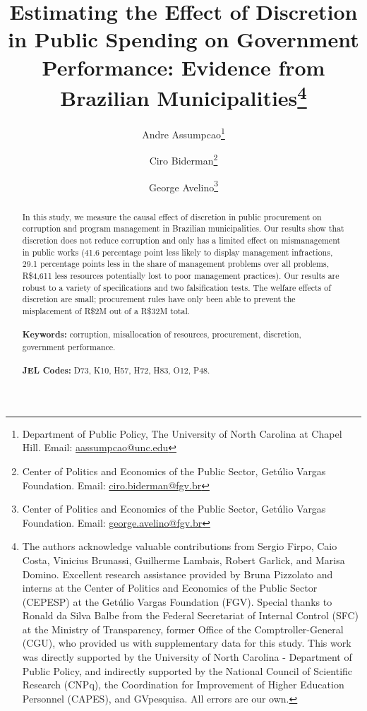 \documentclass[11pt]{article}
\begin{document}
\begin{titlepage}
\title{Estimating the Effect of Discretion in Public Spending on Government Performance: Evidence from Brazilian Municipalities\thanks{The authors acknowledge valuable contributions from Sergio Firpo, Caio Costa, Vinicius Brunassi, Guilherme Lambais,
Robert Garlick, and Marisa Domino. Excellent research assistance provided by Bruna Pizzolato and interns at the Center of Politics and Economics of the Public Sector (CEPESP) at the Getúlio Vargas Foundation (FGV). Special thanks to Ronald da Silva Balbe from the Federal Secretariat of Internal Control (SFC) at the Ministry of Transparency, former Office of the Comptroller-General (CGU), who provided us with supplementary data for this study. This work was directly supported by the University of North Carolina - Department of Public Policy, and indirectly supported by the National Council of Scientific Research (CNPq), the Coordination for Improvement of Higher Education Personnel (CAPES), and GVpesquisa. All errors are our own.}}
\author{Andre Assumpcao\thanks{Department of Public Policy, The University of North Carolina at Chapel Hill. Email: \href{mailto:aassumpcao@unc.edu}{aassumpcao@unc.edu}} \and Ciro Biderman\thanks{Center of Politics and Economics of the Public Sector, Getúlio Vargas Foundation. Email: \href{mailto:ciro.biderman@fgv.br}{ciro.biderman@fgv.br}} \and George Avelino\thanks{Center of Politics and Economics of the Public Sector, Getúlio Vargas Foundation. Email: \href{mailto:george.avelino@fgv.br}{george.avelino@fgv.br}}}

\maketitle
\begin{abstract}
\noindent In this study, we measure the causal effect of discretion in public procurement on corruption and program management in Brazilian municipalities. Our results show that discretion does not reduce corruption and only has a limited effect on mismanagement in public works (41.6 percentage point less likely to display management infractions, 29.1 percentage points less in the  share of management problems over all problems, R\$4,611 less resources potentially lost to poor management practices). Our results are robust to a variety of specifications and two falsification tests. The welfare effects of discretion are small; procurement rules have only been able to prevent the misplacement of R\$2M out of a R\$32M total. \\
\vspace{0in}\\
\noindent\textbf{Keywords:} corruption, misallocation of resources, procurement, discretion, government performance.\\
\vspace{0in}\\
\noindent\textbf{JEL Codes:} D73, K10, H57, H72, H83, O12, P48.\\

\bigskip
\end{abstract}
\setcounter{page}{0}
\thispagestyle{empty}
\end{titlepage}
\pagebreak \newpage
\end{document}
